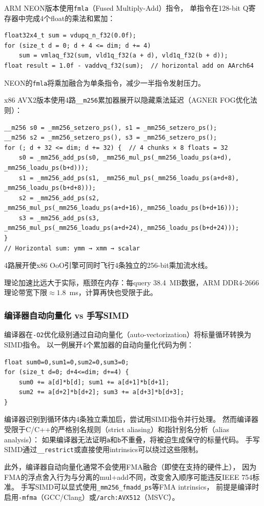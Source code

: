 \documentclass[11pt,a4paper]{article}
\begin{document}
ARM NEON版本使用\texttt{fmla}（Fused Multiply-Add）指令，
单指令在128-bit Q寄存器中完成4个float的乘法和累加：
\begin{lstlisting}
float32x4_t sum = vdupq_n_f32(0.0f);
for (size_t d = 0; d + 4 <= dim; d += 4)
    sum = vmlaq_f32(sum, vld1q_f32(a + d), vld1q_f32(b + d));
float result = 1.0f - vaddvq_f32(sum);  // horizontal add on AArch64
\end{lstlisting}
NEON的\texttt{fmla}将乘加融合为单条指令，减少一半指令发射压力。

x86 AVX2版本使用4路\texttt{\_\_m256}累加器展开以隐藏乘法延迟（AGNER FOG优化法则）：
\begin{lstlisting}
__m256 s0 = _mm256_setzero_ps(), s1 = _mm256_setzero_ps();
__m256 s2 = _mm256_setzero_ps(), s3 = _mm256_setzero_ps();
for (; d + 32 <= dim; d += 32) {  // 4 chunks × 8 floats = 32
    s0 = _mm256_add_ps(s0, _mm256_mul_ps(_mm256_loadu_ps(a+d),   _mm256_loadu_ps(b+d)));
    s1 = _mm256_add_ps(s1, _mm256_mul_ps(_mm256_loadu_ps(a+d+8), _mm256_loadu_ps(b+d+8)));
    s2 = _mm256_add_ps(s2, _mm256_mul_ps(_mm256_loadu_ps(a+d+16),_mm256_loadu_ps(b+d+16)));
    s3 = _mm256_add_ps(s3, _mm256_mul_ps(_mm256_loadu_ps(a+d+24),_mm256_loadu_ps(b+d+24)));
}
// Horizontal sum: ymm → xmm → scalar
\end{lstlisting}
4路展开使x86 OoO引擎可同时飞行4条独立的256-bit乘加流水线。

理论加速比远大于实际，瓶颈在内存：每query 38.4~MB数据，ARM DDR4-2666理论带宽下限$\approx 1.8$~ms，计算再快也受限于此。

\subsubsection{编译器自动向量化 vs 手写SIMD}

编译器在\texttt{-O2}优化级别通过自动向量化（auto-vectorization）将标量循环转换为SIMD指令。
以一例展开4个累加器的自动向量化代码为例：
\begin{lstlisting}
float sum0=0,sum1=0,sum2=0,sum3=0;
for (size_t d=0; d+4<=dim; d+=4) {
    sum0 += a[d]*b[d]; sum1 += a[d+1]*b[d+1];
    sum2 += a[d+2]*b[d+2]; sum3 += a[d+3]*b[d+3];
}
\end{lstlisting}
编译器识别到循环体内4条独立乘加后，尝试用SIMD指令并行处理。
然而编译器受限于C/C++的严格别名规则（strict aliasing）和指针别名分析（alias analysis）：
如果编译器无法证明\texttt{a}和\texttt{b}不重叠，将被迫生成保守的标量代码。
手写SIMD通过\texttt{\_\_restrict}或直接使用intrinsics可以绕过这些限制。

此外，编译器自动向量化通常不会使用FMA融合（即使在支持的硬件上），
因为FMA的浮点舍入行为与分离的mul+add不同，改变舍入顺序可能违反IEEE 754标准。
手写SIMD可以显式使用\texttt{\_mm256\_fmadd\_ps}等FMA intrinsics，
前提是编译时启用\texttt{-mfma}（GCC/Clang）或\texttt{/arch:AVX512}（MSVC）。
\end{document}
